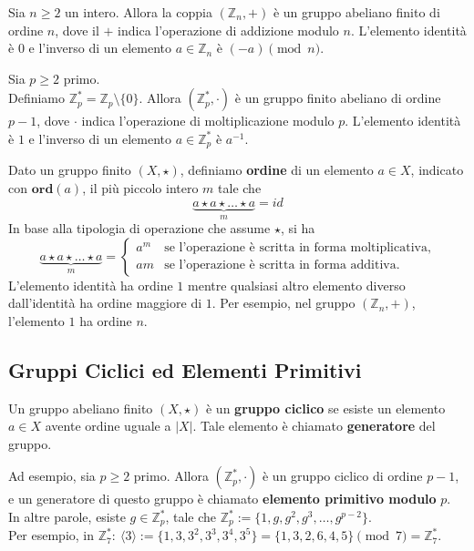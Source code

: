 \begin{de} Sia $n \geq 2$ un intero. Allora la coppia $(\mathbb{Z}_n, +)$ è un gruppo abeliano finito di ordine $n$, dove il $+$ indica l'operazione di addizione modulo $n$. L'elemento identità è $0$ e l'inverso di un elemento $a \in \mathbb{Z}_n \text{ è } (-a) \pmod{n}$. 
\end{de}

\begin{de} Sia $p \geq 2$ primo.\\ Definiamo $\mathbb{Z}_p^\ast = \mathbb{Z}_p \setminus \{0\}$. Allora $(\mathbb{Z}_p^\ast, \cdot)$ è un gruppo finito abeliano di ordine $p - 1$, dove $\cdot$ indica l'operazione di moltiplicazione modulo $p$. L'elemento identità è $1$ e l'inverso di un elemento $a \in \mathbb{Z}_p^\ast \text{ è } a^{-1}$.
\end{de}

\begin{de} Dato un gruppo finito $(X, \star)$, definiamo \textbf{ordine} di un elemento $a \in X$, indicato con $\mathbf{ord}(a)$, il più piccolo intero $m$ tale che
	$$\underbrace{a \star a \star \ldots \star a}_{m} = id$$
	In base alla tipologia di operazione che assume $\star$, si ha
	\[
		\underbrace{a \star a \star \ldots \star a}_{m} =
		\begin{cases}
			a^m & \text{se l'operazione è scritta in forma moltiplicativa}, \\[6pt]
			am  & \text{se l'operazione è scritta in forma additiva}.       
		\end{cases}
	\]
	L'elemento identità ha ordine $1$ mentre qualsiasi altro elemento diverso dall'identità ha ordine maggiore di $1$.
	Per esempio, nel gruppo $(\mathbb{Z}_n, +)$, l'elemento $1$ ha ordine $n$.
\end{de}

\subsection{Gruppi Ciclici ed Elementi Primitivi}

\begin{de}\label{def:gruppo_ciclico} Un gruppo abeliano finito $(X, \star)$ è un \textbf{gruppo ciclico} se esiste un elemento $a \in X$ avente ordine uguale a $|X|$. Tale elemento è chiamato \textbf{generatore} del gruppo.
	
	Ad esempio, sia $p \geq 2$ primo. Allora $(\mathbb{Z}_p^\ast, \cdot)$ è un gruppo ciclico di ordine $p - 1$, e un generatore di questo gruppo è chiamato \textbf{elemento primitivo modulo} $p$.\\
	In altre parole, esiste $g \in \mathbb{Z}_p^\ast$, tale che $\mathbb{Z}_p^\ast := \{1, g, g^2, g^3, \ldots, g^{p-2}\}$.\\
	Per esempio, in $\mathbb{Z}_7^\ast:\ \langle3\rangle := \{1, 3, 3^2, 3^3, 3^4, 3^5\} = \{1, 3, 2, 6, 4, 5\} \pmod{7} = \mathbb{Z}_7^\ast$.
\end{de}

